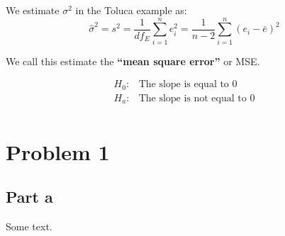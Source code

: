 \documentclass[12pt]{notes}
\begin{document}

\begin{minipage}[l][2cm][c]{\textwidth}

\end{minipage}

We estimate $\sigma^2$ in the Toluca example as: 
\[\hat{\sigma}^2 = s^2 = \frac{1}{df_E}\sum_{i=1}^ne_i^2 = \frac{1}{n-2}\sum_{i=1}^n\left(e_i-\bar{e}\right)^2\]

We call this estimate the \textbf{``mean square error''} or MSE. 

\begin{minipage}[l][2cm][c]{\textwidth}

\end{minipage}


\begin{align*}
H_0: & \text{The slope is equal to 0} \\
H_a: & \text{The slope is not equal to 0} \\
\end{align*}





\section*{Problem 1}
\subsection*{Part a}



Some text.



























\end{document}
